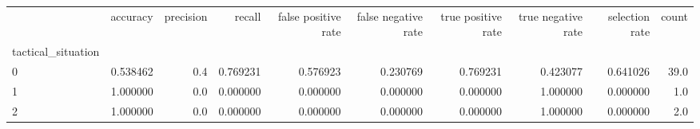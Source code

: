 \begin{tabular}{lrrrrrrrrr}
\toprule
{} &  accuracy &  precision &    recall &  false positive rate &  false negative rate &  true positive rate &  true negative rate &  selection rate &  count \\
tactical\_situation &           &            &           &                      &                      &                     &                     &                 &        \\
\midrule
0                  &  0.538462 &        0.4 &  0.769231 &             0.576923 &             0.230769 &            0.769231 &            0.423077 &        0.641026 &   39.0 \\
1                  &  1.000000 &        0.0 &  0.000000 &             0.000000 &             0.000000 &            0.000000 &            1.000000 &        0.000000 &    1.0 \\
2                  &  1.000000 &        0.0 &  0.000000 &             0.000000 &             0.000000 &            0.000000 &            1.000000 &        0.000000 &    2.0 \\
\bottomrule
\end{tabular}
